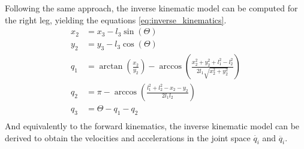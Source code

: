 Following the same approach, the inverse kinematic model can be computed for the right leg, yielding the equations \ref{eq:inverse_kinematics}.
\begin{equation}
\label{eq:inverse_kinematics}
	\begin{aligned}
		x_{2} &= x_{3} - l_{3} \sin(\Theta) \\
		y_{2} &= y_{3} - l_{3} \cos(\Theta) \\
		q_{1} &= \arctan \left(\frac{x_{2}}{y_{2}}\right) - \arccos \left(\frac{x_{2}^2 + y_{2}^2 + l_{1}^2 - l_{2}^2}{2 l_{1} \sqrt{x_{2}^2 + y_{2}^2}}\right) \\
		q_{2} &= \pi - \arccos \left(\frac{l_{1}^2 + l_{2}^2 - x_{2} - y_{2}}{2 l_{1} l_{2}}\right) \\
		q_{3} &= \Theta - q_{1} - q_{2} \\
	\end{aligned}
\end{equation}
And equivalently to the forward kinematics, the inverse kinematic model can be derived to obtain the velocities and accelerations in the joint space $\dot{q_{i}}$ and $\ddot{q_{i}}$.
